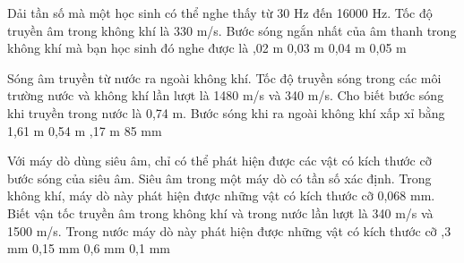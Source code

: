 \begin{ex}
Dải tần số mà một học sinh có thể nghe thấy từ 30 Hz đến 16000 Hz. Tốc độ truyền âm trong không khí là 330 m/s. Bước sóng ngắn nhất của âm thanh trong không khí mà bạn học sinh đó nghe được là
\choice
{,02 m}
{0,03 m}
{0,04 m}
{0,05 m}
\end{ex} 
\begin{ex}%
Sóng âm truyền từ nước ra ngoài không khí. Tốc độ truyền sóng trong các môi trường nước và không khí lần lượt là 1480 m/s và 340 m/s. Cho biết bước sóng khi truyền trong nước là 0,74 m. Bước sóng khi ra ngoài không khí xấp xỉ bằng
\choice
{1,61 m}
{0,54 m}
{,17 m}
{85 mm}
\end{ex} 
\begin{ex}%
Với máy dò dùng siêu âm, chỉ có thể phát hiện được các vật có kích thước cỡ bước sóng của siêu âm. Siêu âm trong một máy dò có tần số xác định. Trong không khí, máy dò này phát hiện được những vật có kích thước cỡ 0,068 mm. Biết vận tốc truyền âm trong không khí và trong nước lần lượt là 340 m/s và 1500 m/s. Trong nước máy dò này phát hiện được những vật có kích thước cỡ
\choice
{,3 mm}
{0,15 mm}
{0,6 mm}
{0,1 mm}
\end{ex} 

